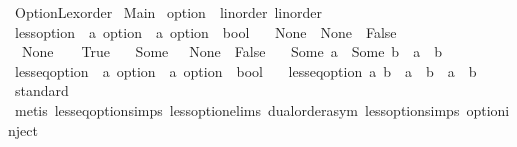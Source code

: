 %
\begin{isabellebody}%
%
%
\isadelimtheory
%
\endisadelimtheory
%
\isatagtheory
{}\isamarkupfalse%
\ Option{\isacharunderscore}Lexorder\isanewline
{}\ Main\isanewline
{}%
\endisatagtheory
{\isafoldtheory}%
%
\isadelimtheory
\isanewline
%
\endisadelimtheory
\isanewline
{}\isamarkupfalse%
\ option\ {\isacharcolon}{\isacharcolon}\ {\isacharparenleft}linorder{\isacharparenright}\ linorder\ \isanewline
{}\isamarkupfalse%
\ less{\isacharunderscore}option\ {\isacharcolon}{\isacharcolon}\ {\isachardoublequoteopen}{\isacharprime}a\ option\ {\isasymRightarrow}\ {\isacharprime}a\ option\ {\isasymRightarrow}\ bool{\isachardoublequoteclose}\ \isanewline
\ \ {\isachardoublequoteopen}None\ {\isacharless}\ None\ {\isacharequal}\ False{\isachardoublequoteclose}\ {\isacharbar}\isanewline
\ \ {\isachardoublequoteopen}None\ {\isacharless}\ {\isacharunderscore}\ {\isacharequal}\ True{\isachardoublequoteclose}\ {\isacharbar}\isanewline
\ \ {\isachardoublequoteopen}Some\ {\isacharunderscore}\ {\isacharless}\ None\ {\isacharequal}\ False{\isachardoublequoteclose}\ {\isacharbar}\isanewline
\ \ {\isachardoublequoteopen}Some\ a\ {\isacharless}\ Some\ b\ {\isacharequal}\ {\isacharparenleft}a\ {\isacharless}\ b{\isacharparenright}{\isachardoublequoteclose}\isanewline
\isanewline
{}\isamarkupfalse%
\ less{\isacharunderscore}eq{\isacharunderscore}option\ {\isacharcolon}{\isacharcolon}\ {\isachardoublequoteopen}{\isacharprime}a\ option\ {\isasymRightarrow}\ {\isacharprime}a\ option\ {\isasymRightarrow}\ bool{\isachardoublequoteclose}\ \isanewline
\ \ {\isachardoublequoteopen}less{\isacharunderscore}eq{\isacharunderscore}option\ a\ b\ {\isacharequal}\ {\isacharparenleft}a\ {\isacharless}\ b\ {\isasymor}\ a\ {\isacharequal}\ b{\isacharparenright}{\isachardoublequoteclose}\isanewline
\isanewline
{}\isamarkupfalse%
\isanewline
%
\isadelimproof
\ \ %
\endisadelimproof
%
\isatagproof
{}\isamarkupfalse%
\ standard\isanewline
\ \ \isamarkupfalse%
\ {\isacharparenleft}metis\ less{\isacharunderscore}eq{\isacharunderscore}option{\isachardot}simps\ less{\isacharunderscore}option{\isachardot}elims{\isacharparenleft}{}{\isacharparenright}\ dual{\isacharunderscore}order{\isachardot}asym\ less{\isacharunderscore}option{\isachardot}simps{\isacharparenleft}{}{\isacharparenright}\ option{\isachardot}inject{\isacharparenright}\isanewline

\end{isabellebody}
